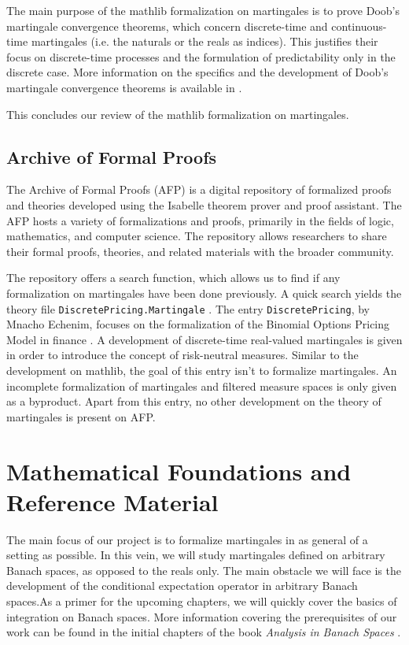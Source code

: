 The main purpose of the \textsf{mathlib} formalization on martingales is to prove Doob's martingale convergence theorems, which concern discrete-time and continuous-time martingales (i.e. the naturals or the reals as indices). This justifies their focus on discrete-time processes and the formulation of predictability only in the discrete case. More information on the specifics and the development of Doob's martingale convergence theorems is available in \cite{ying2022formalization}.

This concludes our review of the \textsf{mathlib} formalization on martingales.

\subsection{Archive of Formal Proofs}

The Archive of Formal Proofs (\textsf{AFP}) is a digital repository of formalized proofs and theories developed using the Isabelle theorem prover and proof assistant. The \textsf{AFP}  hosts a variety of formalizations and proofs, primarily in the fields of logic, mathematics, and computer science. The repository allows researchers to share their formal proofs, theories, and related materials with the broader community.

The repository offers a search function, which allows us to find if any formalization on martingales have been done previously. A quick search yields the theory file \texttt{DiscretePricing.Martingale} \cite{DiscretePricing-AFP}. The entry \texttt{DiscretePricing}, by Mnacho Echenim, focuses on the formalization of the Binomial Options Pricing Model in finance \cite{EchenimPeltier}. A development of discrete-time real-valued martingales is given in order to introduce the concept of risk-neutral measures. Similar to the development on \textsf{mathlib}, the goal of this entry isn't to formalize martingales. An incomplete formalization of martingales and filtered measure spaces is only given as a byproduct.
Apart from this entry, no other development on the theory of martingales is present on \textsf{AFP}.

\section{Mathematical Foundations and Reference Material}

The main focus of our project is to formalize martingales in as general of a setting as possible. In this vein, we will study martingales defined on arbitrary Banach spaces, as opposed to the reals only. The main obstacle we will face is the development of the conditional expectation operator in arbitrary Banach spaces.As a primer for the upcoming chapters, we will quickly cover the basics of integration on Banach spaces. More information covering the prerequisites of our work can be found in the initial chapters of the book \textit{Analysis in Banach Spaces} \cite{Hytoenen_2016}.

